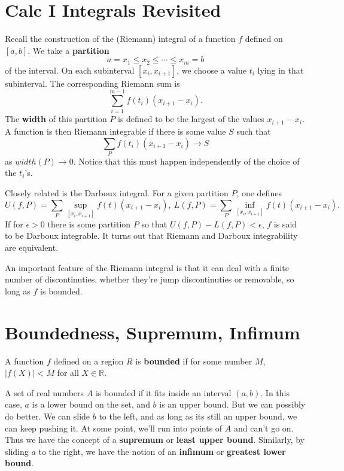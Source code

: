 \documentclass{article}
\begin{document}

\section*{Calc I Integrals Revisited}

Recall the construction of the (Riemann) integral of a function $f$ defined on $[a,b]$.
We take a \textbf{partition} \[a = x_1 \leq x_2 \leq \cdots \leq x_m = b\]
of the interval. On each subinterval $[x_i,x_{i+1}]$, we choose a value 
$t_i$ lying in that subinterval. The corresponding Riemann sum is 
\[\sum_{i=1}^{m-1} f(t_i)(x_{i+1}-x_i).\]
The \textbf{width} of this partition $P$ is defined to be the largest
of the values $x_{i+1} - x_i$. A function is then Riemann integrable if there 
is some value $S$ such that
\[\sum_P f(t_i)(x_{i+1}-x_i) \to S\]
as $width(P) \to 0$. Notice that this must happen independently of the choice
of the $t_i$'s. 

Closely related is the Darboux integral. For a given partition $P$, one defines
\[U(f,P) = \sum_P \sup_{[x_i,x_{i+1}]} f(t)(x_{i+1}-x_i),\ L(f,P) = \sum_P \inf_{[x_i,x_{i+1}]} f(t) (x_{i+1}-x_i).\]
If for $\epsilon > 0$ there is some partition $P$ so that
$U(f,P) - L(f,P) < \epsilon$, $f$ is said to be Darboux integrable.
It turns out that Riemann and Darboux integrability are equivalent.

An important feature of the Riemann integral is that it can deal with
a finite number of discontinuties, whether they're jump discontinuties 
or removable, so long as $f$ is bounded.

\section*{Boundedness, Supremum, Infimum}
A function $f$ defined on a region $R$ is \textbf{bounded} if for some number $M$, $|f(X)| < M$ for all $X \in \mathbb{R}$.

A set of real numbers $A$ is bounded if it fits inside an interval $(a,b)$.
In this case, $a$ is a lower bound on the set, and $b$ is an upper bound.
But we can possibly do better. We can slide $b$ to the left, and as long as 
its still an upper bound, we can keep pushing it. At some point, we'll run into points
of $A$ and can't go on. Thus we have the concept of a \textbf{supremum} or 
\textbf{least upper bound}. Similarly, by sliding $a$ to the right,
we have the notion of an \textbf{infimum} or \textbf{greatest lower bound}.
\end{document}
